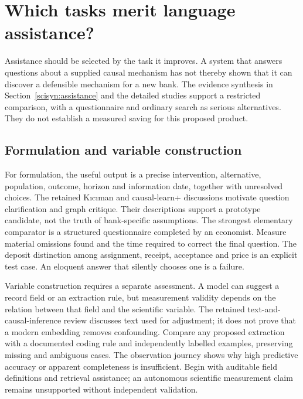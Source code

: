 \chapter{Which tasks merit language assistance?}
\label{rewrite:assistance-tasks}

Assistance should be selected by the task it improves. A system that answers
questions about a supplied causal mechanism has not thereby shown that
it can discover a defensible mechanism for a new bank. The evidence
synthesis in Section~\ref{scisyn:assistance} and the detailed studies
support a restricted comparison, with a questionnaire and ordinary search
as serious alternatives. They do not establish a measured saving for this
proposed product.



\section{Formulation and variable construction}
For formulation, the useful output is a precise intervention, alternative,
population, outcome, horizon and information date, together with unresolved
choices. The retained Kıcıman and causal-learn+ discussions motivate
question clarification and graph critique. Their descriptions support
a prototype candidate, not the truth of bank-specific assumptions.
\citep{v12_la_2305_00050,v12_la_2606_23608}
The strongest elementary comparator is a structured questionnaire completed
by an economist. Measure material omissions found and the time required
to correct the final question. The deposit distinction among assignment,
receipt, acceptance and price is an explicit test case. An eloquent
answer that silently chooses one is a failure.

Variable construction requires a separate assessment. A model can suggest
a record field or an extraction rule, but measurement validity depends
on the relation between that field and the scientific variable. The
retained text-and-causal-inference review discusses text used for adjustment;
it does not prove that a modern embedding removes confounding.
\citep{exec13_census_text_review_arxiv}
Compare any proposed extraction with a documented coding rule and
independently labelled examples, preserving missing and ambiguous cases.
The observation journey shows why high predictive accuracy or apparent
completeness is insufficient. Begin with auditable field definitions and
retrieval assistance; an autonomous scientific measurement claim remains
unsupported without independent validation.


